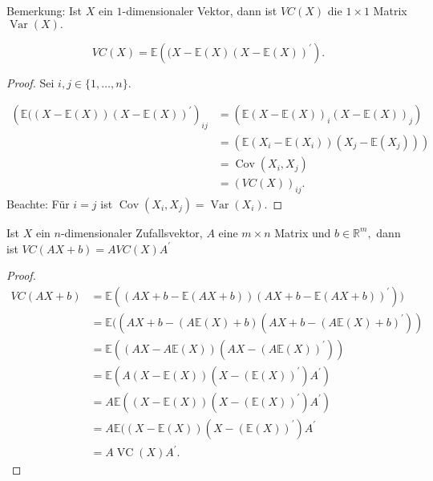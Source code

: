 \documentclass{tstextbook}
\DeclareMathOperator{\Cov}{Cov}
\DeclareMathOperator{\VC}{VC} %
\DeclareMathOperator{\Var}{Var}
\begin{document}
\begin{remark}
	Bemerkung: Ist $X$ ein $1$-dimensionaler Vektor, dann ist $VC(X)$ die $1\times1$ Matrix $\Var(X).$
\end{remark}

\begin{theorem}
    \[ VC(X)=\mathbb{E}\left((X-\mathbb{E}(X)(X-\mathbb{E}(X))^\prime \right).\]
\end{theorem}

\begin{proof}
    Sei $i,j\in\lbrace1,\ldots,n\rbrace.$

\begin{equation*}
\begin{split}
\left(\mathbb{E}((X-\mathbb{E}(X))(X-\mathbb{E}(X))^\prime\right)_{ij} & = \left(\mathbb{E}(X-\mathbb{E}(X))_i(X-\mathbb{E}(X))_j\right) \\
 & = \left(\mathbb{E}(X_i-\mathbb{E}(X_i))(X_j-\mathbb{E}(X_j))\right) \\
 &= \Cov(X_i,X_j) \\
 &= (VC(X))_{ij}. 
\end{split}
\end{equation*}
Beachte: Für $i=j$ ist $\Cov(X_i,X_j)=\Var(X_i). $
    
\end{proof}

\begin{theorem}
    Ist $X$ ein $n$-dimensionaler Zufallsvektor, $A$ eine $m\times n$ Matrix und $b\in\mathbb{R}^m,$ dann ist $VC(AX+b)=AVC(X)A^\prime$
\end{theorem}
   
        
\begin{proof}
\begin{align*}
    	VC(AX+b) & = \mathbb{E}((AX+b-\mathbb{E}(AX+b))(AX+b-\mathbb{E}(AX+b))^\prime)) \\
    	& = \mathbb{E}((AX+b-(A\mathbb{E}(X)+b)(AX+b-(A\mathbb{E}(X)+b)^\prime)) \\
    	& = \mathbb{E}((AX-A\mathbb{E}(X))(AX-(A\mathbb{E}(X))^\prime)) \\
    	& = \mathbb{E}(A(X-\mathbb{E}(X))(X-(\mathbb{E}(X))^\prime)A^\prime) \\
    	& = A\mathbb{E}((X-\mathbb{E}(X))(X-(\mathbb{E}(X))^\prime)A^\prime) \\
    	& = A\mathbb{E}((X-\mathbb{E}(X))(X-(\mathbb{E}(X))^\prime)A^\prime \\
    	& = A\VC(X)A^\prime.
\end{align*} 
\end{proof}
\end{document}
